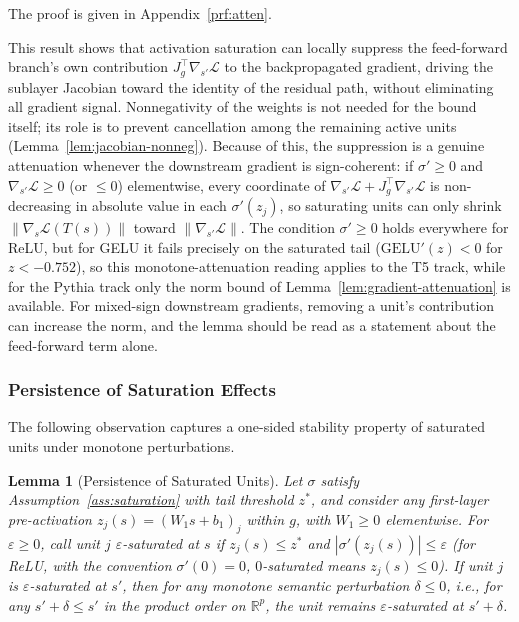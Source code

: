 \documentclass{article}
\theoremstyle{plain}
\newtheorem{lemma}[theorem]{Lemma}
\theoremstyle{definition}
\theoremstyle{remark}
\theoremstyle{plain}
\begin{document}
The proof is given in Appendix~\ref{prf:atten}.

This result shows that activation saturation can locally suppress the feed-forward
branch's own contribution $J_g^\top\nabla_{s'}\mathcal{L}$ to the backpropagated
gradient, driving the sublayer Jacobian toward the identity of the residual path,
without eliminating all gradient signal. Nonnegativity of the weights is not needed
for the bound itself; its role is to prevent cancellation among the remaining active
units (Lemma~\ref{lem:jacobian-nonneg}). Because of this, the suppression is a
genuine attenuation whenever the downstream gradient is sign-coherent: if
$\sigma' \ge 0$ and $\nabla_{s'}\mathcal{L} \ge 0$ (or $\le 0$) elementwise, every
coordinate of $\nabla_{s'}\mathcal{L} + J_g^\top\nabla_{s'}\mathcal{L}$ is
non-decreasing in absolute value in each $\sigma'(z_j)$, so saturating units can
only shrink $\|\nabla_s\mathcal{L}(T(s))\|$ toward $\|\nabla_{s'}\mathcal{L}\|$.
The condition $\sigma' \ge 0$ holds everywhere for ReLU, but for GELU it fails
precisely on the saturated tail ($\mathrm{GELU}'(z) < 0$ for $z < -0.752$), so this
monotone-attenuation reading applies to the T5 track, while for the Pythia track only
the norm bound of Lemma~\ref{lem:gradient-attenuation} is available. For mixed-sign
downstream gradients, removing a unit's contribution can increase the norm, and the
lemma should be read as a statement about the feed-forward term alone.


\subsubsection{Persistence of Saturation Effects}

The following observation captures a one-sided stability property of saturated
units under monotone perturbations.

\begin{lemma}[Persistence of Saturated Units]
\label{lem:persistence}
Let $\sigma$ satisfy Assumption~\ref{ass:saturation} with tail threshold $z^\ast$,
and consider any first-layer pre-activation $z_j(s)= (W_1 s + b_1)_j$ within $g$,
with $W_1\ge 0$ elementwise. For $\varepsilon \ge 0$, call unit $j$
\emph{$\varepsilon$-saturated} at $s$ if $z_j(s) \le z^\ast$ and
$|\sigma'(z_j(s))| \le \varepsilon$ (for ReLU, with the convention $\sigma'(0)=0$,
$0$-saturated means $z_j(s) \le 0$). If unit $j$ is $\varepsilon$-saturated at $s'$,
then for any monotone semantic perturbation $\delta \le 0$, i.e., for any
$s' + \delta \le s'$ in the product order on $\mathbb{R}^p$, the unit remains
$\varepsilon$-saturated at $s'+\delta$.
\end{lemma}
\end{document}
